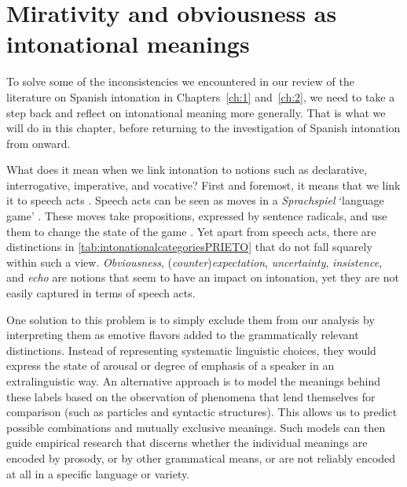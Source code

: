 
\chapter{Mirativity and obviousness as intonational meanings} %
\label{ch:3} %



To solve some of the inconsistencies we encountered in our review of the literature on Spanish intonation in Chapters~\ref{ch:1} and~\ref{ch:2}, we need to take a step back and reflect on intonational meaning more generally. That is what we will do in this chapter, before returning to the investigation of Spanish intonation from  onward.

What does it mean when we link intonation to notions such as declarative, interrogative, imperative, and vocative? First and foremost, it means that we link it to speech acts \citep{Austin.1962,Searle.1969}. Speech acts can be seen as moves in a \textit{Sprachspiel} `language game' \citep{Wittgenstein.2009}. These moves take propositions, expressed by sentence radicals, and use them to change the state of the game \citep[62--66]{Krifka.2014}. Yet apart from speech acts, there are distinctions in \autoref{tab:intonationalcategoriesPRIETO} that 
do not fall squarely within such a view. \textit{Obviousness}, 
(\textit{counter})\textit{expectation}, \textit{uncertainty}, 
\textit{insistence}, and \textit{echo} are notions that seem to have an impact on intonation, yet they are not easily captured in terms of speech acts. 

One solution to this problem is to simply exclude them from our analysis 
by interpreting them as emotive flavors added to the grammatically 
relevant distinctions. Instead of representing systematic linguistic 
choices, they would express the state of arousal or degree of emphasis of a speaker in an extralinguistic way. An alternative approach is to 
model the meanings behind these labels based on the observation of phenomena that lend themselves for comparison (such as particles and syntactic structures). This allows us to predict possible combinations and mutually exclusive meanings. Such models can then guide empirical research that discerns whether the individual meanings are encoded by prosody, or by other grammatical means, or are not reliably encoded at all in a specific language or variety.

